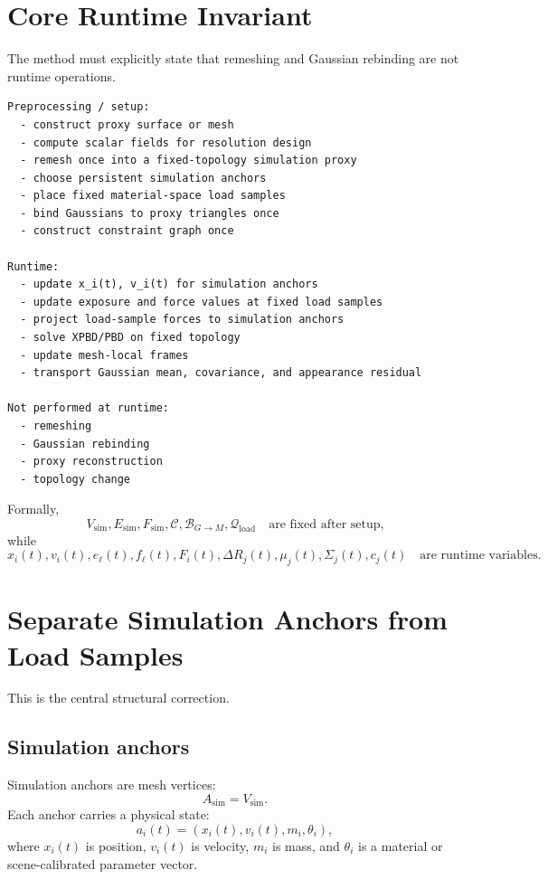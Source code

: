 \documentclass[11pt,a4paper]{article}
\begin{document}
\section{Core Runtime Invariant}

The method must explicitly state that remeshing and Gaussian rebinding are not runtime operations.

\begin{lstlisting}
Preprocessing / setup:
  - construct proxy surface or mesh
  - compute scalar fields for resolution design
  - remesh once into a fixed-topology simulation proxy
  - choose persistent simulation anchors
  - place fixed material-space load samples
  - bind Gaussians to proxy triangles once
  - construct constraint graph once

Runtime:
  - update x_i(t), v_i(t) for simulation anchors
  - update exposure and force values at fixed load samples
  - project load-sample forces to simulation anchors
  - solve XPBD/PBD on fixed topology
  - update mesh-local frames
  - transport Gaussian mean, covariance, and appearance residual

Not performed at runtime:
  - remeshing
  - Gaussian rebinding
  - proxy reconstruction
  - topology change
\end{lstlisting}

Formally,
\[
V_{\mathrm{sim}},E_{\mathrm{sim}},F_{\mathrm{sim}},\mathcal{C},\mathcal{B}_{G\rightarrow M},\mathcal{Q}_{\mathrm{load}}
\quad\text{are fixed after setup,}
\]
while
\[
x_i(t),v_i(t),e_\ell(t),f_\ell(t),F_i(t),\Delta R_j(t),\mu_j(t),\Sigma_j(t),c_j(t)
\quad\text{are runtime variables.}
\]

\section{Separate Simulation Anchors from Load Samples}

This is the central structural correction.

\subsection{Simulation anchors}

Simulation anchors are mesh vertices:
\[
A_{\mathrm{sim}}=V_{\mathrm{sim}}.
\]
Each anchor carries a physical state:
\[
a_i(t)=\left(x_i(t),v_i(t),m_i,\theta_i\right),
\]
where $x_i(t)$ is position, $v_i(t)$ is velocity, $m_i$ is mass, and $\theta_i$ is a material or scene-calibrated parameter vector.
\end{document}
